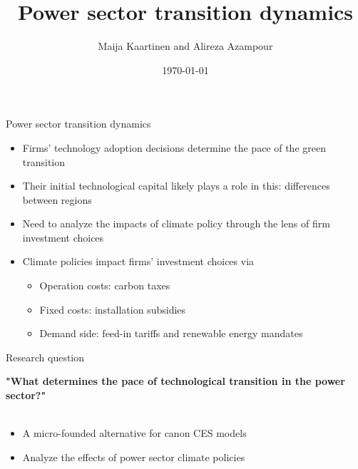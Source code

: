 \documentclass{beamer}
\begin{document}
\title{Power sector transition dynamics}
\author{Maija Kaartinen and Alireza Azampour}
\date{\today}
\maketitle
	

\begin{frame}{Power sector transition dynamics}

\begin{itemize}
\item Firms' technology adoption decisions determine the pace of the green transition
\item Their initial technological capital likely plays a role in this: differences between regions
\item Need to analyze the impacts of climate policy through the lens of firm investment choices
 \hfill \break
 \item Climate policies impact firms' investment choices via
 \begin{itemize}
     \item Operation costs: carbon taxes
     \item Fixed costs: installation subsidies
     \item Demand side: feed-in tariffs and renewable energy mandates
 \end{itemize}

\end{itemize}
\end{frame}


\begin{frame}{Research question}
\large 
\begin{center}
    \textbf{"What determines the pace of technological transition in the power sector?"}\\\\
\hfill \break
\hfill \break
\begin{itemize}
    \item A micro-founded alternative for canon CES models
    \item Analyze the effects of power sector climate policies 
\end{itemize}
\end{center}
\end{frame}

\end{document}
